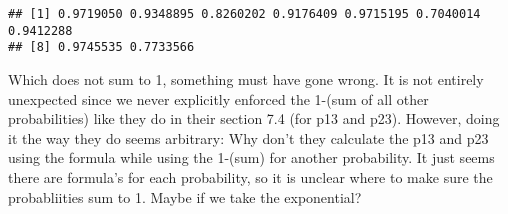 \documentclass[
]{article}
\newenvironment{Shaded}{\begin{snugshade}}{\end{snugshade}}
\newcommand{\AttributeTok}[1]{\textcolor[rgb]{0.13,0.29,0.53}{#1}}
\newcommand{\CommentTok}[1]{\textcolor[rgb]{0.56,0.35,0.01}{\textit{#1}}}
\newcommand{\ControlFlowTok}[1]{\textcolor[rgb]{0.13,0.29,0.53}{\textbf{#1}}}
\newcommand{\DecValTok}[1]{\textcolor[rgb]{0.00,0.00,0.81}{#1}}
\newcommand{\FunctionTok}[1]{\textcolor[rgb]{0.13,0.29,0.53}{\textbf{#1}}}
\newcommand{\NormalTok}[1]{#1}
\newcommand{\OtherTok}[1]{\textcolor[rgb]{0.56,0.35,0.01}{#1}}
\newcommand{\SpecialCharTok}[1]{\textcolor[rgb]{0.81,0.36,0.00}{\textbf{#1}}}
\begin{document}
\begin{Shaded}
\end{Shaded}

\begin{verbatim}
## [1] 0.9719050 0.9348895 0.8260202 0.9176409 0.9715195 0.7040014 0.9412288
## [8] 0.9745535 0.7733566
\end{verbatim}

Which does not sum to 1, something must have gone wrong. It is not
entirely unexpected since we never explicitly enforced the 1-(sum of all
other probabilities) like they do in their section 7.4 (for p13 and
p23). However, doing it the way they do seems arbitrary: Why don't they
calculate the p13 and p23 using the formula while using the 1-(sum) for
another probability. It just seems there are formula's for each
probability, so it is unclear where to make sure the probabliities sum
to 1. Maybe if we take the exponential?
\end{document}
